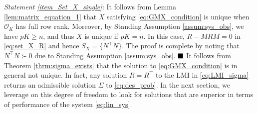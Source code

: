 \documentclass{ifacconf}
\newcommand{\calO}{\ensuremath{\mathcal{O}}}
\newcommand{\+}{\mathsmaller{+}}
\renewcommand{\qed}{\hfill\blacksquare}
\begin{document}
\par \textit{Statement \ref{item_Set_X_single}:}
	It follows from Lemma \ref{lem:matrix_equation_1} that $X$ satisfying \eqref{eq:GMX_condition} is unique when $\calO_K$ has full row rank. Moreover, by Standing Assumption \ref{assum:sys_obs}, we have $pK \geq n$, and thus $X$ is unique if $pK=n$. In this case,
	$R - MRM = 0$ in \eqref{eq:set_X_R} and hence $S_X = \{N^{\top}N\}$.
%
%
%
The proof is complete by noting that $N^\top N \succ 0$ due to Standing Assumption \ref{assum:sys_obs}. 
%
%
$\qed$
It follows from Theorem \ref{thrm:sigma_exists} that the solution to \eqref{eq:GMX_condition} is in general not unique.  
In fact, any solution $R=R^\top$ to the LMI in \eqref{eq:LMI_sigma} returns an admissible solution $\Sigma$ to \eqref{eq:des_prob}.  In the next section, we leverage on this degree of freedom to look for solutions that are superior in terms of performance of the system \eqref{eq:lin_sys}.
\end{document}
